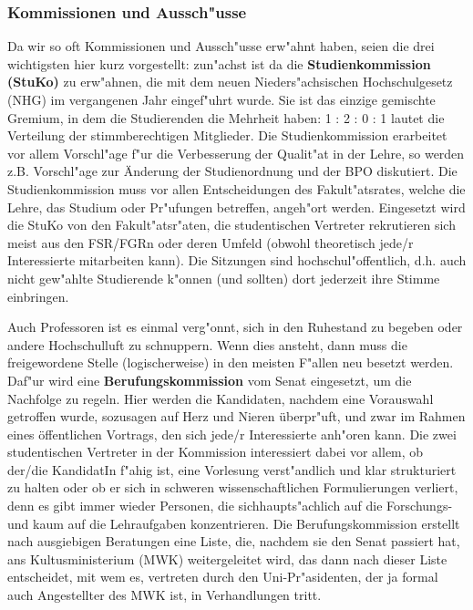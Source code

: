 \begin{multicols}{2}
	\subsubsection*{Kommissionen und Aussch"usse}
		Da wir so oft Kommissionen und Aussch"usse erw"ahnt haben, seien die drei wichtigsten hier kurz vorgestellt: zun"achst ist da die \textbf{Studienkommission (StuKo)} zu erw"ahnen, die mit dem neuen Nieders"achsischen Hochschulgesetz (NHG) im vergangenen Jahr eingef"uhrt wurde. Sie ist das einzige gemischte Gremium, in dem die Studierenden die Mehrheit haben: 1 : 2 : 0 : 1 lautet die Verteilung der stimmberechtigen Mitglieder. Die Studienkommission erarbeitet vor allem Vorschl"age f"ur die Verbesserung der Qualit"at in der Lehre, so werden z.B. Vorschl"age zur Änderung der Studienordnung und der BPO diskutiert. Die Studienkommission muss vor allen Entscheidungen des Fakult"atsrates, welche die Lehre, das Studium oder Pr"ufungen betreffen, angeh"ort werden. Eingesetzt wird die StuKo von den Fakult"atsr"aten, die studentischen Vertreter rekrutieren sich meist aus den FSR/FGRn oder deren Umfeld (obwohl theoretisch jede/r Interessierte mitarbeiten kann). Die Sitzungen sind hochschul"offentlich, d.h. auch nicht gew"ahlte Studierende k"onnen (und sollten) dort jederzeit ihre Stimme einbringen.

		Auch Professoren ist es einmal verg"onnt, sich in den Ruhestand zu begeben oder andere Hochschulluft zu schnuppern. Wenn dies ansteht, dann muss die freigewordene Stelle (logischerweise) in den meisten F"allen neu besetzt werden. Daf"ur wird eine \textbf{Berufungskommission} vom Senat eingesetzt, um die Nachfolge zu regeln. Hier werden die Kandidaten, nachdem eine Vorauswahl getroffen wurde, sozusagen auf Herz und Nieren überpr"uft, und zwar im Rahmen eines öffentlichen Vortrags, den sich jede/r Interessierte anh"oren kann. Die zwei studentischen Vertreter in der Kommission interessiert dabei vor allem, ob der/die KandidatIn f"ahig ist, eine Vorlesung verst"andlich und klar strukturiert zu halten oder ob er sich in schweren wissenschaftlichen Formulierungen verliert, denn es gibt immer wieder Personen, die sichhaupts"achlich auf die Forschungs- und kaum auf die Lehraufgaben konzentrieren. Die Berufungskommission erstellt nach ausgiebigen Beratungen eine Liste, die, nachdem sie den Senat passiert hat, ans Kultusministerium (MWK) weitergeleitet wird, das dann nach dieser Liste entscheidet, mit wem es, vertreten durch den Uni-Pr"asidenten, der ja formal auch Angestellter des MWK ist, in Verhandlungen tritt.


\end{multicols}
